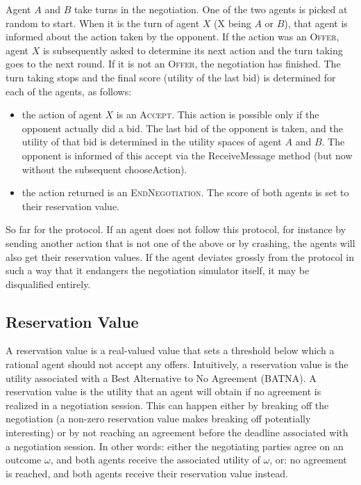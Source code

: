\documentclass[]{article}
\newcommand\AI[1]{{}} \newcommand\ANAC[1]{{#1}}
\begin{document}
Agent $A$ and $B$ take turns in the negotiation. One of the two agents is picked at random to start. When it is the turn of agent $X$ (X being $A$ or $B$), that agent is informed about the action taken by the opponent. If the action was an \textsc{Offer}, agent $X$ is subsequently asked to determine its next action and the turn taking goes to the next round. If it is not an \textsc{Offer}, the negotiation has finished. The turn taking stops and the final score (utility of the last bid) is determined for each of the agents, as follows:
\begin{itemize}
	\item the action of agent $X$ is an \textsc{Accept}. This action is possible only if the opponent actually did a bid. The last bid of the opponent is taken, and the utility of that bid is determined in the utility spaces of agent $A$ and $B$. The opponent is informed of this accept via the ReceiveMessage method (but now without the subsequent chooseAction).
	\item the action returned is an \textsc{EndNegotiation}. The score of both agents is set to their reservation value.
\end{itemize}

So far for the protocol. If an agent does not follow this protocol, for instance by sending another action that is not one of the above or by crashing, the agents will also \ANAC{get their reservation values}\AI{score zero}. If the agent deviates grossly from the protocol in such a way that it endangers the negotiation simulator itself, it may be disqualified entirely.
 
\subsection{Reservation Value}

A reservation value is a real-valued value that sets a threshold below which a rational agent should not accept any offers. Intuitively, a reservation value is the utility associated with a Best Alternative to No Agreement (BATNA). A reservation value is the utility that an agent will obtain if no agreement is realized in a negotiation session. This can happen either by breaking off the negotiation (a non-zero reservation value makes breaking off potentially interesting) or by not reaching an agreement before the deadline associated with a negotiation session. In other words: either the negotiating parties agree on an outcome $\omega$, and both agents receive the associated utility of $\omega$, or: no agreement is reached, and both agents receive their reservation value instead.
\end{document}
